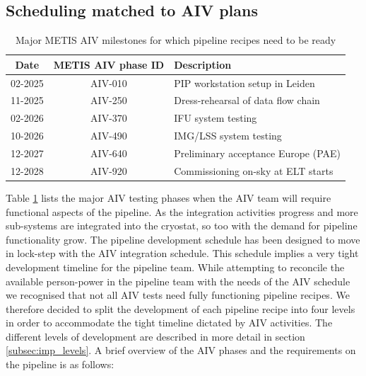 \documentclass[a4paper]{spie}  %
\begin{document}
\subsection{Scheduling matched to AIV plans}
\label{subsec:imp_aiv}

\begin{table}[]
    \centering
\caption{Major METIS AIV milestones for which pipeline recipes need to be ready}
\label{tab:dev_aiv_milestones}
    \begin{tabular}{c|c|l}
    \hline
    \hline
         Date &   METIS AIV phase ID & Description\\
         \hline
         02-2025 &   AIV-010&PIP workstation setup in Leiden\\
         11-2025 &   AIV-250&Dress-rehearsal of data flow chain\\
 02-2026 & AIV-370&IFU system testing\\
 10-2026 &  AIV-490&IMG/LSS system testing\\
 12-2027 & AIV-640&Preliminary acceptance Europe (PAE)\\
 12-2028 & AIV-920&Commissioning on-sky at ELT starts\\
 \hline
 \end{tabular}
      
\end{table}

Table \ref{tab:dev_aiv_milestones} lists the major AIV testing phases when the AIV team will require functional aspects of the pipeline. 
As the integration activities progress and more sub-systems are integrated into the cryostat, so too with the demand for pipeline functionality grow. 
The pipeline development schedule has been designed to move in lock-step with the AIV integration schedule.
This schedule implies a very tight development timeline for the pipeline team.
While attempting to reconcile the available person-power in the pipeline team with the needs of the AIV schedule we recognised that not all AIV tests need fully functioning pipeline recipes. 
We therefore decided to split the development of each pipeline recipe into four levels in order to accommodate the tight timeline dictated by AIV activities.
The different levels of development are described in more detail in section \ref{subsec:imp_levels}.
A brief overview of the AIV phases and the requirements on the pipeline is as follows:
\end{document}
